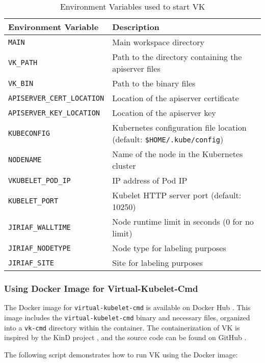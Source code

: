 \begin{table}[h!]
\centering
\caption{Environment Variables used to start VK}
\begin{tabular}{|l|p{10cm}|}
\hline
\textbf{Environment Variable} & \textbf{Description} \\
\hline
\texttt{MAIN} & Main workspace directory \\
\hline
\texttt{VK\_PATH} & Path to the directory containing the apiserver files \\
\hline
\texttt{VK\_BIN} & Path to the binary files \\
\hline
\texttt{APISERVER\_CERT\_LOCATION} & Location of the apiserver certificate \\
\hline
\texttt{APISERVER\_KEY\_LOCATION} & Location of the apiserver key \\
\hline
\texttt{KUBECONFIG} & Kubernetes configuration file location (default: \texttt{\$HOME/.kube/config}) \\
\hline
\texttt{NODENAME} & Name of the node in the Kubernetes cluster \\
\hline
\texttt{VKUBELET\_POD\_IP} & IP address of Pod IP \\
\hline
\texttt{KUBELET\_PORT} & Kubelet HTTP server port (default: 10250) \\
\hline
\texttt{JIRIAF\_WALLTIME} & Node runtime limit in seconds (0 for no limit) \\
\hline
\texttt{JIRIAF\_NODETYPE} & Node type for labeling purposes \\
\hline
\texttt{JIRIAF\_SITE} & Site for labeling purposes \\
\hline
\end{tabular}
\label{table:environment_variables}
\end{table}

\subsubsection{Using Docker Image for Virtual-Kubelet-Cmd}

The Docker image for \texttt{virtual-kubelet-cmd} is available on Docker Hub \cite{docker-vk-cmd}. This image includes the \texttt{virtual-kubelet-cmd} binary and necessary files, organized into a \texttt{vk-cmd} directory within the container. The containerization of VK is inspired by the KinD project \cite{KinD}, and the source code can be found on GitHub \cite{vk-cmd-build-img}.

The following script demonstrates how to run VK using the Docker image:

